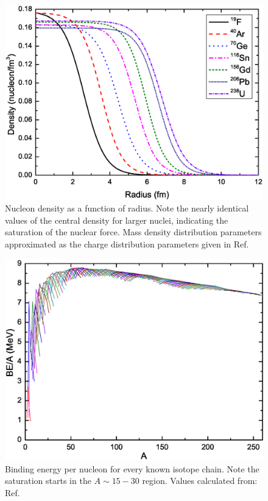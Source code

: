 \begin{figure}[h!]
\centerline{\includegraphics[height=0.3\textheight]{./img/c2/density_plot.eps}}
	\caption{Nucleon density as a function of radius. Note the nearly identical values of the central density for larger nuclei, indicating the saturation of the nuclear force. Mass density distribution parameters approximated as the charge distribution parameters given in Ref. \cite{chargeRadii}\label{fig:chp2-density}}
\end{figure}


\begin{figure}[h!]
\centerline{\includegraphics[height=0.3\textheight]{./img/c2/binding_plot.eps}}
	\caption{Binding energy per nucleon for every known isotope chain. Note the saturation starts in the $A\sim15-30$ region. Values calculated from: Ref. \cite{AME20031,AME20032}\label{fig:chp2-bpa}}
\end{figure}



